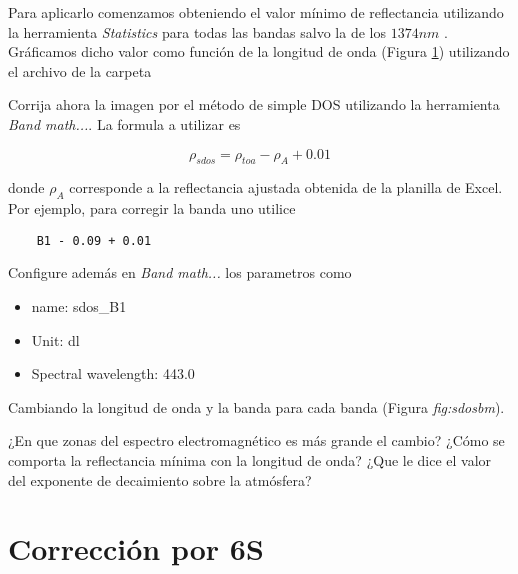 Para aplicarlo comenzamos obteniendo el valor mínimo de reflectancia utilizando la herramienta \emph{Statistics} para todas las bandas salvo la de los $1374nm$ . Gráficamos dicho valor como función de la longitud de onda (Figura \ref{fig:rlambda}) utilizando el archivo  de la carpeta 

\begin{figure}[h!]
    \centering
    \caption{}
    \label{fig:rlambda}
\end{figure}

Corrija ahora la imagen por el método de simple DOS utilizando la herramienta \emph{Band math...}. La formula a utilizar es

\begin{equation}
    \rho_{sdos} = \rho_{toa} - \rho_{A} + 0.01
\end{equation}

donde $\rho_{A}$ corresponde a la reflectancia ajustada obtenida de la planilla de Excel. Por ejemplo, para corregir la banda uno utilice

\begin{verbatim}
    B1 - 0.09 + 0.01
\end{verbatim}

Configure además en \emph{Band math...} los parametros como

\begin{itemize}
    \item name: sdos\_B1
    \item Unit: dl
    \item Spectral wavelength: 443.0
\end{itemize}

Cambiando la longitud de onda y la banda para cada banda (Figura \emph{fig:sdosbm}).

\begin{figure}[h!]
    \centering
    \caption{}
    \label{fig:sdosbm}
\end{figure}

\begin{que}
    ¿En que zonas del espectro electromagnético es más grande el cambio? ¿Cómo se comporta la reflectancia mínima con la longitud de onda? ¿Que le dice el valor del exponente de decaimiento sobre la atmósfera?
\end{que}

\section{Corrección por 6S}

